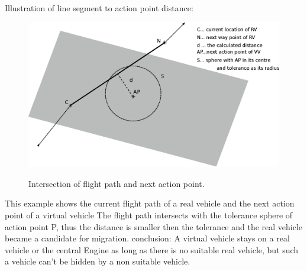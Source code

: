 Illustration of line segment to action point distance:
\begin{figure}[h]
	\begin{center}
		{
            \includegraphics[width=12cm]{dist.eps}
        }
	\end{center}
	\caption{Intersection of flight path and next action point.\label{fig:intersection example}}
\end{figure}
This example shows the current flight path of a real vehicle and the next action point of a virtual vehicle
The flight path intersects with the tolerance sphere of action point P, thus the distance is smaller then the tolerance and
the real vehicle became a candidate for migration.
%
conclusion:
A virtual vehicle stays on a real vehicle or the central Engine as long as there is no suitable real vehicle, but such a vehicle can't 
be hidden by a non suitable vehicle.
